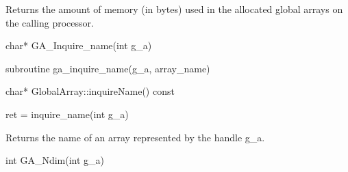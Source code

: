 \documentclass[10pt]{article}
\begin{document}
\begin{desc}

Returns the amount of memory (in bytes) used in the allocated global arrays on
the calling processor.

\end{desc}


\begin{capi}
\begin{ccode}
char* GA_Inquire_name(int g_a)
\end{ccode}
\begin{funcargs}
\end{funcargs}
\end{capi}

\begin{fapi}
\begin{fcode}
subroutine ga_inquire_name(g_a, array_name)
\end{fcode}
\begin{funcargs}
\end{funcargs}
\end{fapi}

\begin{cxxapi}
\begin{cxxcode}
char* GlobalArray::inquireName() const
\end{cxxcode}
\end{cxxapi}

\begin{pyapi}
\begin{pycode}
ret = inquire_name(int g_a)
\end{pycode}
\begin{funcargs}
\end{funcargs}
\end{pyapi}

\local

\begin{desc}

Returns the name of an array represented by the handle g_a.

\end{desc}


\begin{capi}
\begin{ccode}
int GA_Ndim(int g_a)
\end{ccode}
\begin{funcargs}
\end{funcargs}
\end{capi}
\end{document}
